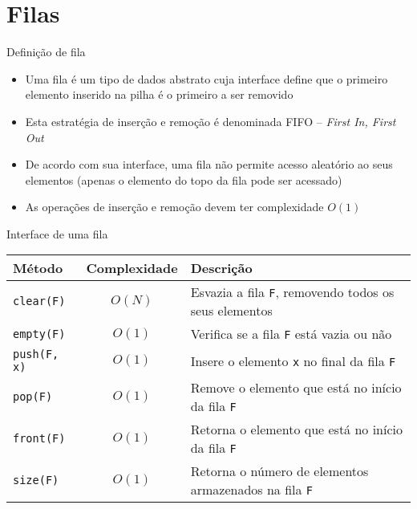 \section{Filas}

\begin{frame}[fragile]{Definição de fila}

    \begin{itemize}
        \item Uma fila é um tipo de dados abstrato cuja interface define que o primeiro elemento
            inserido na pilha é o primeiro a ser removido

        \item Esta estratégia de inserção e remoção é denominada FIFO -- \textit{First In, First
            Out}

        \item De acordo com sua interface, uma fila não permite acesso aleatório ao seus
            elementos (apenas o elemento do topo da fila pode ser acessado)

        \item As operações de inserção e remoção devem ter complexidade $O(1)$

    \end{itemize}

\end{frame}

\begin{frame}[fragile]{Interface de uma fila}

    \begin{table}
        \centering
        \begin{tabularx}{0.95\textwidth}{lcX}
            \toprule
            \textbf{Método} & \textbf{Complexidade} & \textbf{Descrição} \\
            \midrule
            \texttt{clear(F)} & $O(N)$ & Esvazia a fila \texttt{F}, removendo todos os seus elementos \\
            \rowcolor[gray]{0.8}
            \texttt{empty(F)} & $O(1)$ & Verifica se a fila \texttt{F} está vazia ou não \\
            \texttt{push(F, x)} & $O(1)$ & Insere o elemento \texttt{x} no final da fila \texttt{F} \\
            \rowcolor[gray]{0.8}
            \texttt{pop(F)} & $O(1)$ & Remove o elemento que está no início da fila \texttt{F} \\
            \texttt{front(F)} & $O(1)$ & Retorna o elemento que está no início da fila \texttt{F} \\
            \rowcolor[gray]{0.8}
            \texttt{size(F)} & $O(1)$ & Retorna o número de elementos armazenados na fila \texttt{F} \\
            \bottomrule
        \end{tabularx}
    \end{table}
\end{frame}

